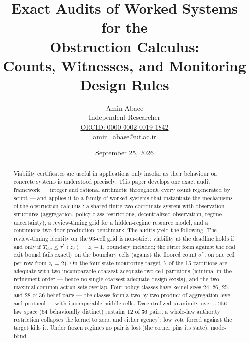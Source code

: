 \documentclass[10pt,twocolumn]{article}
\theoremstyle{definition}
\begin{document}
\title{Exact Audits of Worked Systems for the\\
Obstruction Calculus:\\
Counts, Witnesses, and Monitoring Design Rules}
\author{Amin Abaee\\[0.35em]
{\small Independent Researcher}\\[0.55em]
{\small\href{https://orcid.org/0000-0002-0019-1842}{ORCID: 0000-0002-0019-1842}}\\[0.3em]
{\small\href{mailto:amin\_abaee@ut.ac.ir}{amin\_abaee@ut.ac.ir}}}
\date{September 25, 2026}
\maketitle

\begin{abstract}
Viability certificates are useful in applications only insofar as their behaviour on concrete systems is understood precisely. This paper develops one exact audit framework --- integer and rational arithmetic throughout, every
count regenerated by script --- and applies it to a family of worked
systems that instantiate the mechanisms of the obstruction calculus
: a shared finite two-coordinate system with observation
structures (aggregation, policy-class restrictions, decentralized
observation, regime uncertainty), a review-timing grid for a
hidden-regime resource model, and a continuous two-floor production
benchmark. The audits yield the following. The review-timing identity on
the 93-cell grid is non-strict: viability at the deadline holds if and
only if \(T_{\mathrm{obs}} \le \tau^{*}(z_0) = z_0 - 1\), boundary included; the strict form against the real exit bound fails exactly on the boundary cells (against the floored count \(\sigma^{*}\), on one cell per row from \(z_0 = 2\)). On the four-state
monitoring target, 7 of the 15 partitions are adequate with two incomparable coarsest adequate two-cell partitions (minimal in the refinement order --- hence no single coarsest adequate design exists), and the two maximal common-action sets overlap. Four policy classes have kernel
sizes 24, 26, 25, and 28 of 36 belief pairs --- the classes form a two-by-two product of aggregation level and protocol --- with incomparable middle
cells. Decentralized unanimity over a
\(256\)-law space (\(64\) behaviorally distinct) sustains 12 of 36
pairs; a whole-law authority restriction collapses the kernel to zero,
and either agency's low vote forced against the target kills it. Under
frozen regimes no pair is lost (the corner pins its state); mode-blind

\end{abstract}
\end{document}
